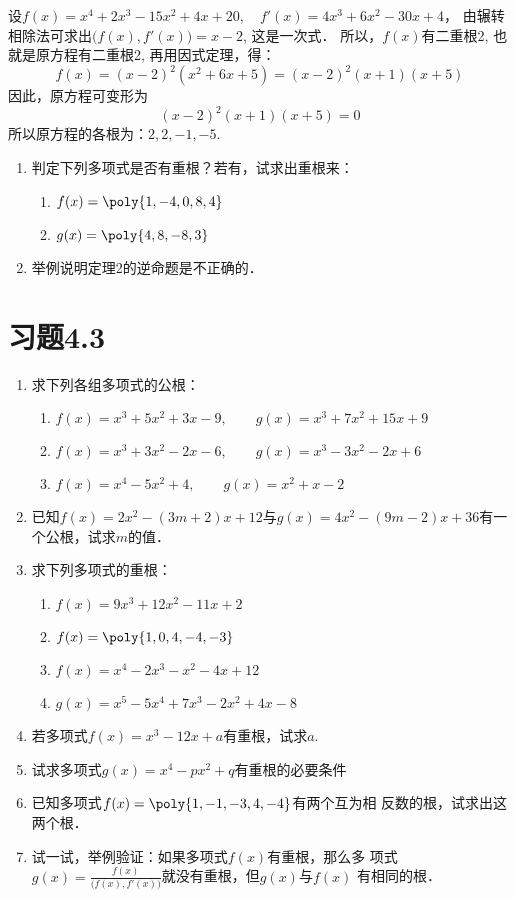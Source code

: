 \begin{solution}
 设$f(x)=x^4+2x^3-15x^2+4x+20,\quad 
f' (x) =4x^3+6x^2-30x+4$，
由辗转相除法可求出$\big(f(x),f'(x)\big)=x-2$, 这是一次式．
所以，$f(x)$有二重根2, 也就是原方程有二重根2, 再用因式定理，得：
\[f (x) = (x-2)^2  (x^2+6x+5)= (x-2)^2 (x+1)(x+5)\]
因此，原方程可变形为
\[(x-2)^2 (x+1)(x+5)=0\]
所以原方程的各根为：$2, 2,-1,-5$.   
\end{solution}

\begin{ex}
    \begin{enumerate}
        \item 判定下列多项式是否有重根？若有，试求出重根来：
\begin{enumerate}
    \item $f(x)=\poly{1,-4,0,8,4}$
    \item $g(x)=\poly{4,8,-8,3}$
\end{enumerate}
        \item 举例说明定理2的逆命题是不正确的．
    \end{enumerate}
\end{ex}

\section*{习题4.3}
\begin{enumerate}
\item 求下列各组多项式的公根：
\begin{enumerate}
    \item $f (x) =x^3+5x^2+3x-9,\qquad 
g (x) =x^3+7x^2+15x+9$
\item $f (x) =x^3+3x^2-2x-6,\qquad 
g (x) =x^3-3x^2-2x+6$
\item  $f (x) =x^4-5x^2+4,\qquad g (x) =x^2+x-2$
\end{enumerate}


\item 已知$f(x)=2x^2-(3m+2)x+12$与$g(x)=4x^2-(9m-2)x+36$有一个公根，试求$m$的值．
\item 求下列多项式的重根：
\begin{enumerate}
    \item $f (x) =9x^3+12x^2-11x+2$
    \item $f(x)=\poly{1,0,4,-4,-3}$
    \item $f (x) =x^4-2x^3-x^2-4x+12$
    \item $g (x) =x^5-5x^4+7x^3-2x^2+4x-8$
\end{enumerate}

\item 若多项式$f(x)=x^3-12x+a$有重根，试求$a$.
\item 试求多项式$g(x)=x^4-px^2+q$有重根的必要条件
\item 已知多项式$f(x)=\poly{1,-1,-3,4,-4}$有两个互为相
反数的根，试求出这两个根．
\item 试一试，举例验证：如果多项式$f(x)$有重根，那么多
项式$g(x)=\frac{f(x)}{\bigl(f (x) ,f' (x)\bigr)}$就没有重根，但$g(x)$与$f(x)$
有相同的根．
\end{enumerate}


